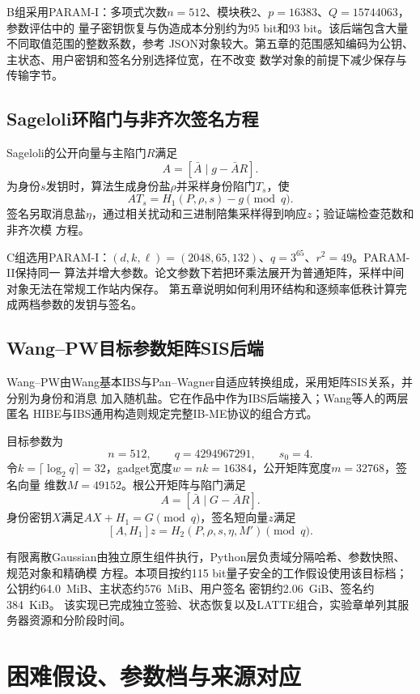 B组采用PARAM-I：多项式次数$n=512$、模块秩2、$p=16383$、$Q=15744063$，参数评估中的
量子密钥恢复与伪造成本分别约为95 bit和93 bit。该后端包含大量不同取值范围的整数系数，参考
JSON对象较大。第五章的范围感知编码为公钥、主状态、用户密钥和签名分别选择位宽，在不改变
数学对象的前提下减少保存与传输字节。

\subsection{Sageloli环陷门与非齐次签名方程}

Sageloli的公开向量与主陷门$R$满足
\[
 A=[\bar A\mid g-\bar AR].
\]
为身份$s$发钥时，算法生成身份盐$\rho$并采样身份陷门$T_s$，使
\[
 AT_s=H_1(P,\rho,s)-g\pmod q.
\]
签名另取消息盐$\eta$，通过相关扰动和三进制陪集采样得到响应$z$；验证端检查范数和非齐次模
方程\cite{sageloli2023ibs}。

C组选用PARAM-I：$(d,k,\ell)=(2048,65,132)$、$q=3^{65}$、$r^2=49$。PARAM-II保持同一
算法并增大参数。论文参数下若把环乘法展开为普通矩阵，采样中间对象无法在常规工作站内保存。
第五章说明如何利用环结构和逐频率低秩计算完成两档参数的发钥与签名。

\subsection{Wang--PW目标参数矩阵SIS后端}

Wang--PW由Wang基本IBS与Pan--Wagner自适应转换组成，采用矩阵SIS关系，并分别为身份和消息
加入随机盐\cite{wang2024ibme,pan2021ibs}。它在作品中作为IBS后端接入；Wang等人的两层匿名
HIBE与IBS通用构造则规定完整IB-ME协议的组合方式。

目标参数为
\[
 n=512,\qquad q=4294967291,\qquad s_0=4.
\]
令$k=\lceil\log_2q\rceil=32$，gadget宽度$w=nk=16384$，公开矩阵宽度$m=32768$，签名向量
维数$M=49152$。根公开矩阵与陷门满足
\[
 A=[\bar A\mid G-\bar AR].
\]
身份密钥$X$满足$AX+H_1=G\pmod q$，签名短向量$z$满足
\[
 [A,H_1]z=H_2(P,\rho,s,\eta,M')\pmod q.
\]

有限离散Gaussian由独立原生组件执行，Python层负责域分隔哈希、参数快照、规范对象和精确模
方程。本项目按约115 bit量子安全的工作假设使用该目标档；公钥约64.0~MiB、主状态约576~MiB、用户签名
密钥约2.06~GiB、签名约384~KiB。
该实现已完成独立签验、状态恢复以及LATTE组合，实验章单列其服务器资源和分阶段时间。

\section{困难假设、参数档与来源对应}

